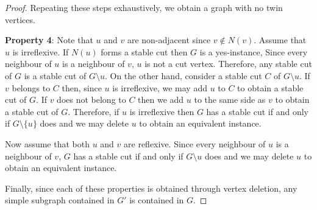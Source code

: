 \documentclass[10pt,a4paper]{amsart}
\begin{document}
\begin{proof}
Repeating these steps exhaustively, we obtain a graph with no twin vertices.

\textbf{Property 4}:
Note that $u$ and $v$ are non-adjacent since $v \notin N(v)$. Assume that $u$ is irreflexive. If $N(u)$ forms a stable cut then $G$ is a yes-instance, Since every neighbour of $u$ is a neighbour of $v$, $u$ is not a cut vertex. Therefore, any stable cut of $G$ is a stable cut of $G \setminus u $. On the other hand, consider a stable cut $C$ of $G \setminus u$. If $v$ belongs to $C$ then, since $u$ is irreflexive, we may add $u$ to $C$ to obtain a stable cut of $G$. If $v$ does not belong to $C$ then we add $u$ to the same side as $v$ to obtain a stable cut of $G$. Therefore, if $u$ is irreflexive then $G$ has a stable cut if and only if $G \setminus \{u\}$ does and we may delete $u$ to obtain an equivalent instance.

Now assume that both $u$ and $v$ are reflexive. Since every neighbour of $u$ is a neighbour of $v$, $G$ has a stable cut if and only if $G \setminus u$ does and we may delete $u$ to obtain an equivalent instance.

Finally, since each of these properties is obtained through vertex deletion, any simple subgraph contained in $G'$ is contained in $G$.%
\end{proof}
\end{document}

